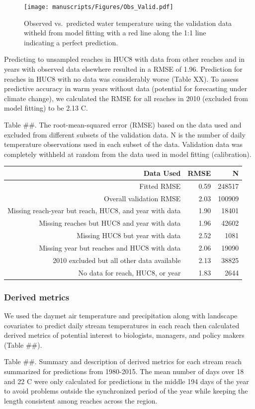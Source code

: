 \begin{figure}[htbp]
\centering
\texttt{[image: manuscripts/Figures/Obs\_Valid.pdf]}
\caption{Observed vs.~predicted water temperature using the validation
data witheld from model fitting with a red line along the 1:1 line
indicating a perfect prediction.}
\end{figure}

Predicting to unsampled reaches in HUC8 with data from other reaches and
in years with observed data elsewhere resulted in a RMSE of 1.96.
Prediction for reaches in HUC8 with no data was considerably worse
(Table XX). To assess predictive accuracy in warm years without data
(potential for forecasting under climate change), we calculated the RMSE
for all reaches in 2010 (excluded from model fitting) to be 2.13 C.

Table \#\#. The root-mean-squared error (RMSE) based on the data used
and excluded from different subsets of the validation data. N is the
number of daily temperature observations used in each subset of the
data. Validation data was completely withheld at random from the data
used in model fitting (calibration).

\begin{longtable}[c]{@{}rrr@{}}
\toprule
Data Used & RMSE & N\tabularnewline
\midrule
\endhead
Fitted RMSE & 0.59 & 248517\tabularnewline
Overall validation RMSE & 2.03 & 100909\tabularnewline
Missing reach-year but reach, HUC8, and year with data & 1.90 &
18401\tabularnewline
Missing reaches but HUC8 and year with data & 1.96 &
42602\tabularnewline
Missing HUC8 but year with data & 2.52 & 1081\tabularnewline
Missing year but reaches and HUC8 with data & 2.06 &
19090\tabularnewline
2010 excluded but all other data available & 2.13 & 38825\tabularnewline
No data for reach, HUC8, or year & 1.83 & 2644\tabularnewline
\bottomrule
\end{longtable}

\subsubsection{Derived metrics}\label{derived-metrics-1}

We used the daymet air temperature and precipitation along with
landscape covariates to predict daily stream temperatures in each reach
then calculated derived metrics of potential interest to biologists,
managers, and policy makers (Table \#\#).

Table \#\#. Summary and description of derived metrics for each stream
reach summarized for predictions from 1980-2015. The mean number of days
over 18 and 22 C were only calculated for predictions in the middle 194
days of the year to avoid problems outside the synchronized period of
the year while keeping the length consistent among reaches across the
region.

